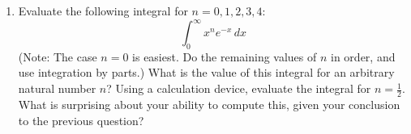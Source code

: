 \documentclass[12pt]{article}
\begin{document}
\begin{enumerate}
\begin{enumerate}[label=(\alph*)]
			\item
			Explain why the following formula works:
			\[ (2k-1)!! = \frac{(2k)!}{k!2^k} \].
			\begin{proof}
				If we can proof $ \cfrac{(2k)!}{k!2^k} = (2k-1)!! $ then $(2k-1)!! = \cfrac{(2k)!}{k!2^k}$ must be true as well.
				\begin{align*}
					 &\cfrac{(2k)!}{k!2^k} \\
					&=\cfrac{2k\cdot (2k-1)\cdot(2k-2)\cdot(2k-3)\cdot(2k-4)...\cdot 1}{k\cdot(k-1)\cdot(k-2)...\cdot1\cdot 2^k}	\\
					&=\cfrac{2\cdot k\cdot (2k-1)\cdot 2\cdot(k-1)\cdot (2k-3) \cdot 2\cdot(k-2)...\cdot 1}{k\cdot(k-1)\cdot(k-2)...\cdot1\cdot 2^k}					 \\
					&=\cfrac{2^k \cdot k\cdot \cdot(k-1) \cdot(k-2)... \cdot 1 \cdot (2k-1) \cdot(2k-3)...\cdot 1}{k\cdot(k-1)\cdot(k-2)...\cdot1\cdot 2^k}					 \\
					&=\cfrac{  k\cdot \cdot(k-1) \cdot(k-2)... \cdot 1 \cdot (2k-1) \cdot(2k-3)...\cdot 1}{k\cdot(k-1)\cdot(k-2)...\cdot1}					 \\
					&=(2k-1) \cdot (2k-3) ... \cdot 1\\
					&= (2k-1)!!
				\end{align*}
			Hence, $ \cfrac{(2k)!}{k!2^k} = (2k-1)!! $  and $(2k-1)!! = \cfrac{(2k)!}{k!2^k}$ is true.
			\end{proof}
			
			
		\end{enumerate}
		
		\item
		Evaluate the following integral for $n = 0, 1, 2, 3, 4$:
		\[ \int_{0}^{\infty} x^ne^{-x} \,dx \]
		(Note: The case $n = 0$ is easiest. Do the remaining values of $n$ in order, and use integration by parts.) What is the value of this integral for an arbitrary natural number $n$? Using a calculation device, evaluate the integral for $n = \frac{1}{2}$. What is surprising about your ability to compute this, given your conclusion to the previous question?
		

\end{enumerate}
\end{document}
